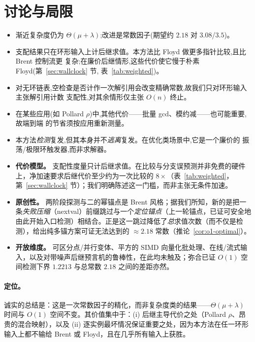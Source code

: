 \documentclass[11pt]{ctexart}
\begin{document}
\section{讨论与局限}
\label{sec:limits}
\begin{itemize}[leftmargin=2em,itemsep=2pt]
  \item 渐近复杂度仍为 $\Theta(\mu+\lambda)$;改进是常数因子(期望约 $2.18$ 对 $3.08$/$3.5$)。
  \item 支配结果只在环形输入上计后继求值。本方法比 Floyd 做更多指针比较,且比 Brent 控制流更
        复杂;在廉价后继情形,这些代价使它慢于朴素 Floyd(第~\ref{sec:wallclock} 节,
        表~\ref{tab:weighted})。
  \item 对无环链表,空检查是否计作一次解引用会改变精确常数,故我们只对环形输入主张解引用计数
        支配性,对其余情形仅主张 $O(n)$ 终止。
  \item 在某些应用(如 Pollard $\rho$)中,其他代价——批量 gcd、模约减——也可能重要,故端到端
        的节省须按应用重新测量。
  \item 本方法\emph{检测}复发,但其本身并不\emph{逃离}复发。在优化类场景中,它是一个廉价的
        振荡/极限环触发器,而非求解器。
  \item \textbf{代价模型。} 支配性度量只计后继求值。在比较与分支误预测并非免费的硬件上，净加速要求后继代价至少约为一次比较的 $8\times$（表~\ref{tab:weighted}，第~\ref{sec:wallclock} 节）；我们明确陈述这一门槛，而非主张无条件加速。
  \item \textbf{原创性。} 两阶段探测与二的幂锚点是 Brent 风格；据我们所知，新的是把一条\emph{失败压缩}（nextval）前缀跳过与一个\emph{定位锚点}（上一轮锚点，已证可安全地由此开始入口检测）相结合。正是这一跳过降低了\emph{总}求值次数（而不仅是检测），给出纯多锚方案可证无法达到的 $\approx2.18$ 常数（推论~\ref{cor:o1-optimal}）。
  \item \textbf{开放维度。} 可区分点/并行变体、平方的 SIMD 向量化批处理、在线/流式输入，以及对带噪声后继预言机的鲁棒性，在此均未触及；弥合已证 $O(1)$ 空间检测下界 $1.2213$ 与总常数 $2.18$ 之间的差距亦然。
\end{itemize}

\paragraph{定位。}
诚实的总结是：这是一次常数因子的精化，而非复杂度类的结果——$\Theta(\mu+\lambda)$ 时间与 $O(1)$ 空间不变。其价值集中于：(i) 后继主导代价之处（Pollard $\rho$、昂贵的混合映射），以及 (ii) 逐实例最坏情况保证重要之处，因为本方法在任一环形输入上都不输给 Brent 或 Floyd，且在几乎所有输入上获胜。
\end{document}
